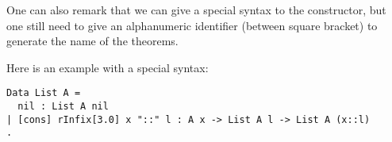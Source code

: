 One can also remark that we can give a special syntax to the
constructor, but one still need to give an alphanumeric identifier
(between square bracket) to generate the name of the theorems.

Here is an example with a special syntax:

\begin{verbatim}
Data List A =
  nil : List A nil
| [cons] rInfix[3.0] x "::" l : A x -> List A l -> List A (x::l)
.
\end{verbatim}



 